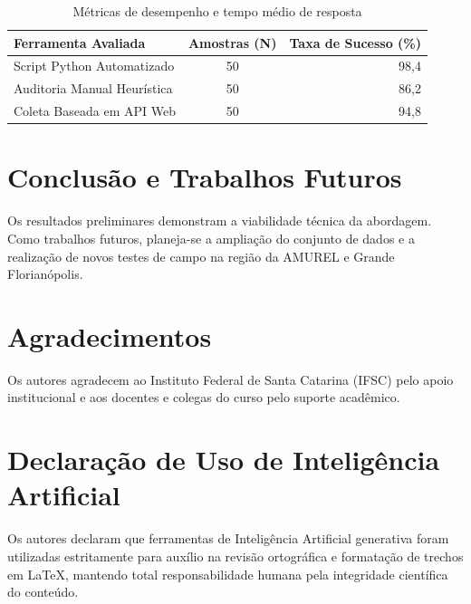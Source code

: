 \documentclass[sigconf,nonacm]{acmart}
\begin{document}
\begin{table}[htbp]
  \caption{Métricas de desempenho e tempo médio de resposta}
  \label{tab:resultados}
  \centering
  \begin{tabular}{lcr}
    \toprule
    \textbf{Ferramenta Avaliada} & \textbf{Amostras (N)} & \textbf{Taxa de Sucesso (\%)} \\
    \midrule
    Script Python Automatizado   & 50                    & 98,4 \\
    Auditoria Manual Heurística  & 50                    & 86,2 \\
    Coleta Baseada em API Web    & 50                    & 94,8 \\
    \bottomrule
  \end{tabular}
\end{table}

\section{Conclusão e Trabalhos Futuros}\label{sec:conclusao}
Os resultados preliminares demonstram a viabilidade técnica da abordagem. Como trabalhos futuros, planeja-se a ampliação do conjunto de dados e a realização de novos testes de campo na região da AMUREL e Grande Florianópolis.

\section*{Agradecimentos}
Os autores agradecem ao Instituto Federal de Santa Catarina (IFSC) pelo apoio institucional e aos docentes e colegas do curso pelo suporte acadêmico.

\section*{Declaração de Uso de Inteligência Artificial}
Os autores declaram que ferramentas de Inteligência Artificial generativa foram utilizadas estritamente para auxílio na revisão ortográfica e formatação de trechos em \LaTeX, mantendo total responsabilidade humana pela integridade científica do conteúdo.



\end{document}

